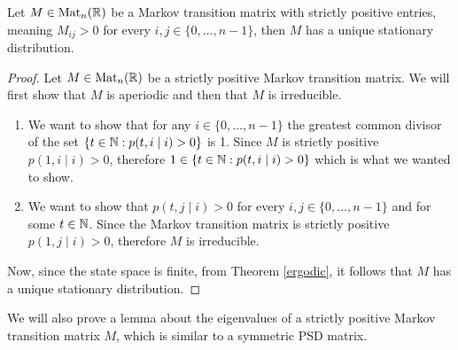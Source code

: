 \begin{theorem}\label{unique_stat_dist}
    Let $M\in\text{Mat}_n(\mathbb{R})$ be a Markov transition matrix with strictly positive entries, meaning $M_{ij}>0$ for every $i,j\in\{0,\dots,n-1\}$, then $M$ has a unique stationary distribution.
\end{theorem}
\begin{proof}
    Let $M\in\text{Mat}_n(\mathbb{R})$ be a strictly positive Markov transition matrix. We will first show that $M$ is aperiodic and then that $M$ is irreducible. 
    \begin{enumerate}
        \renewcommand{\labelenumi}{\arabic{enumi}.}
        \item We want to show that for any $i\in\{0,\dots, n-1\}$ the greatest common divisor of the set $\{t \in\mathbb{N} : p(t,i\mid i) >0\}$ is 1. Since $M$ is strictly positive $p(1, i \mid i)>0$, therefore $1\in\{t \in\mathbb{N} : p(t, i\mid i) >0\}$ which is what we wanted to show.

        \item We want to show that $p(t,j \mid i)>0$ for every $i,j\in\{0,\dots, n-1\}$ and for some $t\in\mathbb{N}$. Since the Markov transition matrix is strictly positive $p(1, j\mid i)>0$, therefore $M$ is irreducible.
    \end{enumerate}

    Now, since the state space is finite, from Theorem \ref{ergodic}, it follows that $M$ has a unique stationary distribution.
\end{proof}

We will also prove a lemma about the eigenvalues of a strictly positive Markov transition matrix $M$, which is similar to a symmetric PSD matrix.

